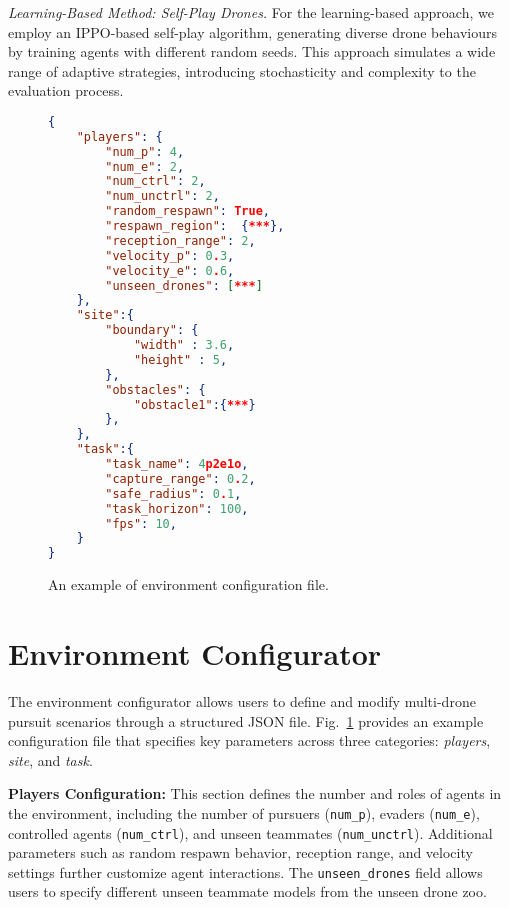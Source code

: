 \textit{Learning-Based Method: Self-Play Drones.}  
For the learning-based approach, we employ an IPPO-based self-play algorithm, generating diverse drone behaviours by training agents with different random seeds. This approach simulates a wide range of adaptive strategies, introducing stochasticity and complexity to the evaluation process.


\begin{figure}[t]
    \centering
\begin{minipage}{0.5\linewidth}
\begin{lstlisting}[language=json]
{
    "players": {
        "num_p": 4, 
        "num_e": 2, 
        "num_ctrl": 2, 
        "num_unctrl": 2, 
        "random_respawn": True,
        "respawn_region":  {***},
        "reception_range": 2,
        "velocity_p": 0.3,
        "velocity_e": 0.6,
        "unseen_drones": [***]
    },
    "site":{
        "boundary": {
            "width" : 3.6, 
            "height" : 5, 
        },
        "obstacles": {
            "obstacle1":{***}
        },
    },
    "task":{
        "task_name": 4p2e1o,
        "capture_range": 0.2,
        "safe_radius": 0.1,
        "task_horizon": 100, 
        "fps": 10,
    }
}
\end{lstlisting}
\end{minipage}
    \caption{An example of environment configuration file.}
    \label{fig:env_json}
\end{figure}

\section{Environment Configurator}
\label{appendix:env_config}

The \framework environment configurator allows users to define and modify multi-drone pursuit scenarios through a structured JSON file. Fig.~\ref{fig:env_json} provides an example configuration file that specifies key parameters across three categories: \textit{players}, \textit{site}, and \textit{task}.

\textbf{Players Configuration:}  
This section defines the number and roles of agents in the environment, including the number of pursuers (\texttt{num\_p}), evaders (\texttt{num\_e}), controlled agents (\texttt{num\_ctrl}), and unseen teammates (\texttt{num\_unctrl}). Additional parameters such as random respawn behavior, reception range, and velocity settings further customize agent interactions. The \texttt{unseen\_drones} field allows users to specify different unseen teammate models from the unseen drone zoo.

